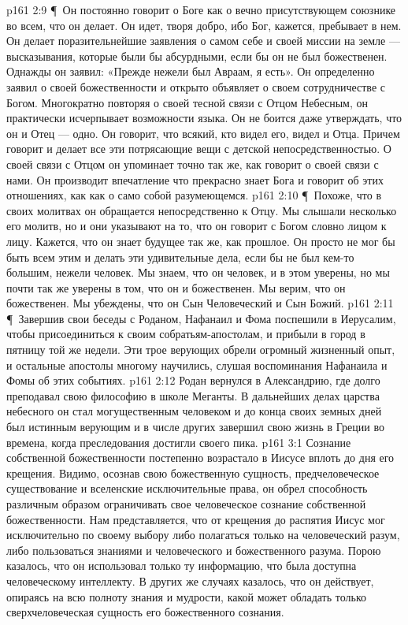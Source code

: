 \vs p161 2:9 \P\ \bibnobreakspace Он постоянно говорит о Боге как о вечно присутствующем союзнике во всем, что он делает. Он идет, творя добро, ибо Бог, кажется, пребывает в нем. Он делает поразительнейшие заявления о самом себе и своей миссии на земле --- высказывания, которые были бы абсурдными, если бы он не был божественен. Однажды он заявил: «Прежде нежели был Авраам, я есть». Он определенно заявил о своей божественности и открыто объявляет о своем сотрудничестве с Богом. Многократно повторяя о своей тесной связи с Отцом Небесным, он практически исчерпывает возможности языка. Он не боится даже утверждать, что он и Отец --- одно. Он говорит, что всякий, кто видел его, видел и Отца. Причем говорит и делает все эти потрясающие вещи с детской непосредственностью. О своей связи с Отцом он упоминает точно так же, как говорит о своей связи с нами. Он производит впечатление что прекрасно знает Бога и говорит об этих отношениях, как как о само собой разумеющемся.
\vs p161 2:10 \P\ \bibnobreakspace Похоже, что в своих молитвах он обращается непосредственно к Отцу. Мы слышали несколько его молитв, но и они указывают на то, что он говорит с Богом словно лицом к лицу. Кажется, что он знает будущее так же, как прошлое. Он просто не мог бы быть всем этим и делать эти удивительные дела, если бы не был кем\hyp{}то большим, нежели человек. Мы знаем, что он человек, и в этом уверены, но мы почти так же уверены в том, что он и божественен. Мы верим, что он божественен. Мы убеждены, что он Сын Человеческий и Сын Божий.
\vs p161 2:11 \P\ Завершив свои беседы с Роданом, Нафанаил и Фома поспешили в Иерусалим, чтобы присоединиться к своим собратьям\hyp{}апостолам, и прибыли в город в пятницу той же недели. Эти трое верующих обрели огромный жизненный опыт, и остальные апостолы многому научились, слушая воспоминания Нафанаила и Фомы об этих событиях.
\vs p161 2:12 Родан вернулся в Александрию, где долго преподавал свою философию в школе Меганты. В дальнейших делах царства небесного он стал могущественным человеком и до конца своих земных дней был истинным верующим и в числе других завершил свою жизнь в Греции во времена, когда преследования достигли своего пика.
\vs p161 3:1 Сознание собственной божественности постепенно возрастало в Иисусе вплоть до дня его крещения. Видимо, осознав свою божественную сущность, предчеловеческое существование и вселенские исключительные права, он обрел способность различным образом ограничивать свое человеческое сознание собственной божественности. Нам представляется, что от крещения до распятия Иисус мог исключительно по своему выбору либо полагаться только на человеческий разум, либо пользоваться знаниями и человеческого и божественного разума. Порою казалось, что он использовал только ту информацию, что была доступна человеческому интеллекту. В других же случаях казалось, что он действует, опираясь на всю полноту знания и мудрости, какой может обладать только сверхчеловеческая сущность его божественного сознания.

